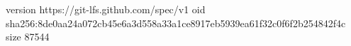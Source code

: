 version https://git-lfs.github.com/spec/v1
oid sha256:8de0aa24a072cb45e6a3d558a33a1ce8917eb5939ea61f32c0f6f2b254842f4c
size 87544
